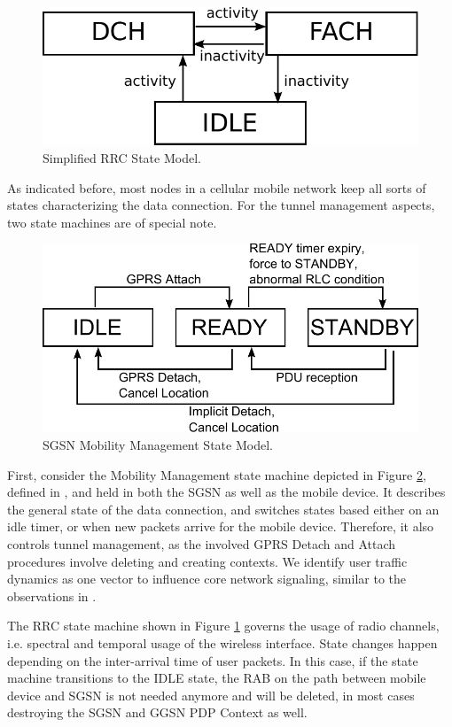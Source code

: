 \begin{figure}[htb]
	\centering
	\includegraphics[width=0.8\columnwidth]{images/rrc-simplified-state-model.pdf}
	\caption{Simplified \gls{RRC} State Model.}
	\label{c4:fig:rrcstatemodel}
\end{figure}


As indicated before, most nodes in a cellular mobile network keep all sorts of states characterizing the data connection. For the tunnel management aspects, two state machines are of special note.

\begin{figure}[htb]
	\centering
	\includegraphics[width=0.8\columnwidth]{images/mm-state-model.pdf}
	\caption{\gls{SGSN} Mobility Management State Model.}
	\label{c4:fig:mmstatemodel}
\end{figure}

First, consider the Mobility Management state machine depicted in Figure \ref{c4:fig:mmstatemodel}, defined in \cite{3gpp23.060}, and held in both the \gls{SGSN} as well as the mobile device. It describes the general state of the data connection, and switches states based either on an idle timer, or when new packets arrive for the mobile device. Therefore, it also controls tunnel management, as the involved \gls{GPRS} Detach and Attach procedures involve deleting and creating contexts. We identify user traffic dynamics as one vector to influence core network signaling, similar to the observations in \cite{lee2007detection}.


The \gls{RRC} state machine shown in Figure \ref{c4:fig:rrcstatemodel} governs the usage of radio channels, i.e. spectral and temporal usage of the wireless interface. State changes happen depending on the inter-arrival time of user packets. In this case, if the state machine transitions to the IDLE state, the \gls{RAB} on the path between mobile device and \gls{SGSN} is not needed anymore and will be deleted, in most cases destroying the \gls{SGSN} and \gls{GGSN} \gls{PDP} Context as well.

